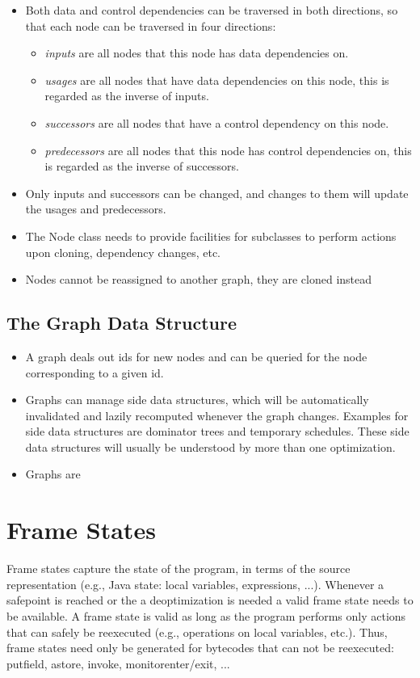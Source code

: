 \begin{itemize}
    \item Both data and control dependencies can be traversed in both directions, so that each node can be traversed in four directions:
    \begin{itemize}
        \item \emph{inputs} are all nodes that this node has data dependencies on.
        \item \emph{usages} are all nodes that have data dependencies on this node, this is regarded as the inverse of inputs.
        \item \emph{successors} are all nodes that have a control dependency on this node.
        \item \emph{predecessors} are all nodes that this node has control dependencies on, this is regarded as the inverse of successors.
    \end{itemize}
    \item Only inputs and successors can be changed, and changes to them will update the usages and predecessors.
    \item The Node class needs to provide facilities for subclasses to perform actions upon cloning, dependency changes, etc.
    \item Nodes cannot be reassigned to another graph, they are cloned instead
\end{itemize}

\subsection{The Graph Data Structure}
\begin{itemize}
    \item A graph deals out ids for new nodes and can be queried for the node corresponding to a given id.
    \item Graphs can manage side data structures, which will be automatically invalidated and lazily recomputed whenever the graph changes. Examples for side data structures are dominator trees and temporary schedules. These side data structures will usually be understood by more than one optimization.
    \item Graphs are 
\end{itemize}

\section{Frame States}
Frame states capture the state of the program, in terms of the source representation (e.g., Java state: local variables, expressions, ...).
Whenever a safepoint is reached or the a deoptimization is needed a valid frame state needs to be available.
A frame state is valid as long as the program performs only actions that can safely be reexecuted (e.g., operations on local variables, etc.).
Thus, frame states need only be generated for bytecodes that can not be reexecuted: putfield, astore, invoke, monitorenter/exit, ...

